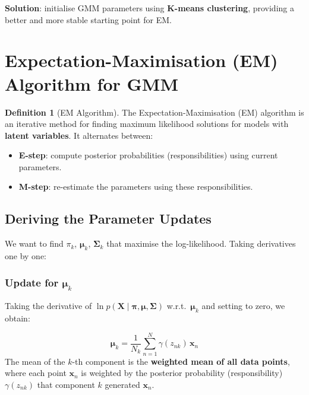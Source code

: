 \documentclass[11pt,a4paper]{article}
\theoremstyle{definition}
\newtheorem{definition}{Definition}[section]
\theoremstyle{plain}
\theoremstyle{remark}
\begin{document}
\textbf{Solution}: initialise GMM parameters using \textbf{K-means clustering}, providing a better and more stable starting point for EM.

\section{Expectation-Maximisation (EM) Algorithm for GMM}

\begin{definition}[EM Algorithm]
The Expectation-Maximisation (EM) algorithm is an iterative method for finding maximum likelihood solutions for models with \textbf{latent variables}. It alternates between:
\begin{itemize}
    \item \textbf{E-step}: compute posterior probabilities (responsibilities) using current parameters.
    \item \textbf{M-step}: re-estimate the parameters using these responsibilities.
\end{itemize}
\end{definition}

\subsection{Deriving the Parameter Updates}

We want to find $\pi_k$, $\boldsymbol{\mu}_k$, $\boldsymbol{\Sigma}_k$ that maximise the log-likelihood. Taking derivatives one by one:

\subsubsection{Update for $\boldsymbol{\mu}_k$}

Taking the derivative of $\ln p(\mathbf{X} \mid \boldsymbol{\pi}, \boldsymbol{\mu}, \boldsymbol{\Sigma})$ w.r.t.\ $\boldsymbol{\mu}_k$ and setting to zero, we obtain:

\begin{tcolorbox}[colback=yellow!10!white,colframe=orange!75!black,title=\textbf{Mean Update}]
\[
\boldsymbol{\mu}_k = \frac{1}{N_k} \sum_{n=1}^{N} \gamma(z_{nk}) \, \mathbf{x}_n
\]
The mean of the $k$-th component is the \textbf{weighted mean of all data points}, where each point $\mathbf{x}_n$ is weighted by the posterior probability (responsibility) $\gamma(z_{nk})$ that component $k$ generated $\mathbf{x}_n$.
\end{tcolorbox}
\end{document}
